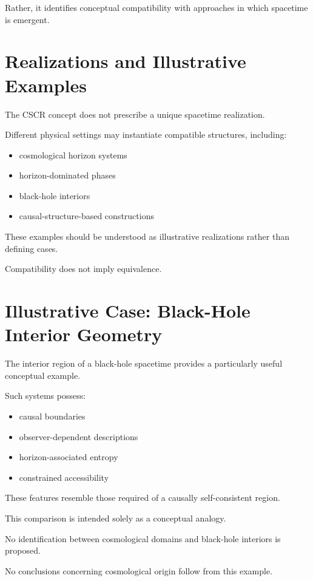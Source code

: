 \documentclass[12pt,a4paper]{article}
\begin{document}
Rather, it identifies conceptual compatibility with approaches in which spacetime is emergent.

\section{Realizations and Illustrative Examples}

The CSCR concept does not prescribe a unique spacetime realization.

Different physical settings may instantiate compatible structures, including:

\begin{itemize}
  \item cosmological horizon systems
  \item horizon-dominated phases
  \item black-hole interiors
  \item causal-structure-based constructions
\end{itemize}

These examples should be understood as illustrative realizations rather than defining cases.

Compatibility does not imply equivalence.

\section{Illustrative Case: Black-Hole Interior Geometry}

The interior region of a black-hole spacetime provides a particularly useful conceptual example.

Such systems possess:

\begin{itemize}
  \item causal boundaries
  \item observer-dependent descriptions
  \item horizon-associated entropy
  \item constrained accessibility
\end{itemize}

These features resemble those required of a causally self-consistent region.

This comparison is intended solely as a conceptual analogy.

No identification between cosmological domains and black-hole interiors is proposed.

No conclusions concerning cosmological origin follow from this example.
\end{document}
